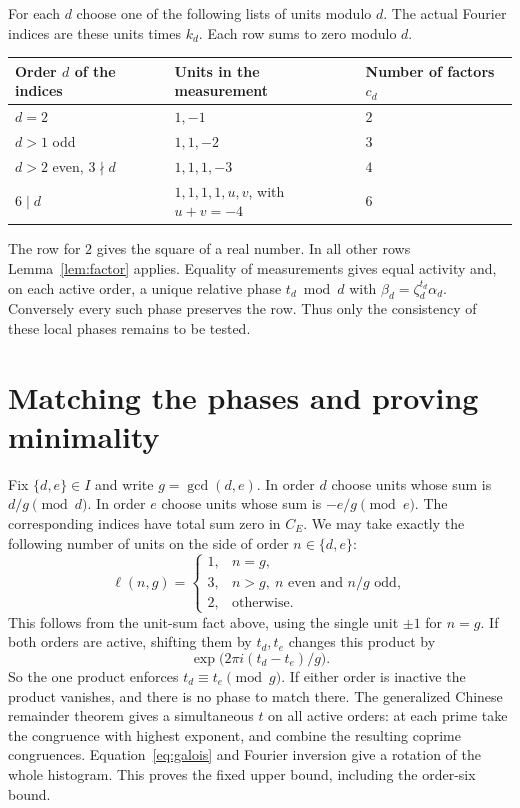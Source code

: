\documentclass[11pt,letterpaper]{article}
\begin{document}
For each $d$ choose one of the following lists of units modulo $d$. The actual Fourier indices are these units times $k_d$. Each row sums to zero modulo $d$.
\begin{center}\small
\begin{tabular}{lll}
\toprule
Order $d$ of the indices & Units in the measurement & Number of factors $c_d$\\\midrule
$d=2$ & $1,-1$ & $2$\\
$d>1$ odd & $1,1,-2$ & $3$\\
$d>2$ even, $3\nmid d$ & $1,1,1,-3$ & $4$\\
$6\mid d$ & $1,1,1,1,u,v$, with $u+v=-4$ & $6$\\\bottomrule
\end{tabular}
\end{center}
The row for $2$ gives the square of a real number. In all other rows Lemma~\ref{lem:factor} applies. Equality of measurements gives equal activity and, on each active order, a unique relative phase $t_d\bmod d$ with $\beta_d=\zeta_d^{t_d}\alpha_d$. Conversely every such phase preserves the row. Thus only the consistency of these local phases remains to be tested.

\newpage
\section{Matching the phases and proving minimality}
Fix $\{d,e\}\in I$ and write $g=\gcd(d,e)$. In order $d$ choose units whose sum is $d/g\pmod d$. In order $e$ choose units whose sum is $-e/g\pmod e$. The corresponding indices have total sum zero in $C_E$. We may take exactly the following number of units on the side of order $n\in\{d,e\}$:
\[
 \ell(n,g)=
 \begin{cases}
 1,&n=g,\\
 3,&n>g,\ n\text{ even and }n/g\text{ odd},\\
 2,&\text{otherwise}.
 \end{cases}
\]
This follows from the unit-sum fact above, using the single unit $\pm1$ for $n=g$. If both orders are active, shifting them by $t_d,t_e$ changes this product by
\[
 \exp\bigl(2\pi i(t_d-t_e)/g\bigr).
\]
So the one product enforces $t_d\equiv t_e\pmod g$. If either order is inactive the product vanishes, and there is no phase to match there. The generalized Chinese remainder theorem gives a simultaneous $t$ on all active orders: at each prime take the congruence with highest exponent, and combine the resulting coprime congruences. Equation~\eqref{eq:galois} and Fourier inversion give a rotation of the whole histogram. This proves the fixed upper bound, including the order-six bound.
\end{document}
